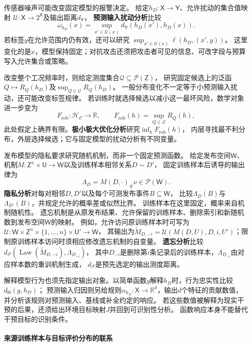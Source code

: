 传感器噪声可能改变固定模型的报警决定。
给定$h_D:\mathsf X\to\mathsf Y$、允许扰动的集合值映射
$\mathcal U:\mathsf X\to2^{\mathsf X}$及输出距离$d_{\mathsf Y}$，
\textbf{预测输入扰动分析}比较
\[
  \omega_{h_D}(x)=\sup_{x'\in\mathcal U(x)}
                  d_{\mathsf Y}(h_D(x'),h_D(x)).
\]
若标签$y$在允许范围内仍有效，还可以研究
$\sup_{x'\in\mathcal U(x)}\ell(h_D,(x',y))$。
这里变化的是$x$，模型保持固定；对抗攻击还须把攻击者可见的信息、可改字段与预算写入允许集合或策略。

改变整个工况频率时，则给定测度集合$\mathcal Q\subseteq\mathcal P(\mathsf Z)$，
研究固定候选上的泛函$Q\mapsto R_Q(h_D)$及$\sup_{Q\in\mathcal Q}R_Q(h_D)$。
一般分布变化不一定等于小预测输入扰动，还可能改变标签规律。
若训练时就选择候选以减小这一最坏风险，数学对象进一步变为
\[
  F_{\mathrm{rob}}:\mathcal H_{\mathcal C}\to\mathbb R,
  \qquad F_{\mathrm{rob}}(h)=\sup_{Q\in\mathcal Q}R_Q(h),
\]
此处假定上确界有限。\textbf{极小极大优化分析}研究$\inf_hF_{\mathrm{rob}}(h)$，
内层寻找最不利分布，外层选择候选；它与固定模型的扰动分析有不同变量。

发布模型的隐私要求研究随机机制，而非一个固定预测函数。
给定发布空间$\mathsf W$、机制$M:\mathsf Z^n\times\mathsf U\to\mathsf W$以及训练样本相邻关系$D\sim D'$，
固定训练样本后诱导的输出律为
\[
  \Lambda_D=M(D,\cdot)_{\#}\nu\in\mathcal P(\mathsf W).
\]
\textbf{隐私分析}对每对相邻$D,D'$以及每个可测发布事件$B\subseteq\mathsf W$，
比较$\Lambda_D(B)$与$\Lambda_{D'}(B)$，并规定允许的概率差或似然比界。
训练样本在这里固定，概率来自机制随机性。
遗忘机制是从原发布结果、允许保留的训练样本、删除索引和新随机数到发布空间$\mathsf W$的映射。
例如，允许访问原训练样本时可写为
$\mathscr U:\mathsf W\times\mathsf Z^n\times\{1,\ldots,n\}\times\mathsf U'\to\mathsf W$，
其输出为$\widetilde M_{D,-i}=\mathscr U(M(D,U),D,i,U')$；限制原训练样本访问时须相应修改遗忘机制的自变量。
\textbf{遗忘分析}比较
$d_{\mathcal P}(\operatorname{Law}(\widetilde M_{D,-i}),\Lambda_{D_{-i}})$，
其中$D_{-i}$是删除第$i$条记录后的训练样本，$\Lambda_{D_{-i}}$由对应样本数的重训机制生成，
$d_{\mathcal P}$是预先选定的输出测度距离。

解释模型行为也须先指定输出对象。以简单函数$g$解释$h_D$时，行为忠实性比较$d_{\mathsf H}(g,h_D)$；
预测输入归因则另给规则$\alpha_{h_D}:\mathsf X\to\mathbb R^d$，输出$d$个特征的贡献数值，
并分析该规则对预测输入、基线或补全约定的响应。
若这些数值被解释为现实干预的后果，还须给出环境目标映射$J$并回到可识别性分析。
函数响应本身不能替代干预目标的识别条件。

\paragraph{来源训练样本与目标评价分布的联系}
\label{sec:future-ml-adaptation-feedback}

